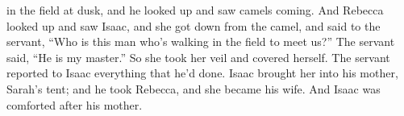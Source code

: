 \begin{inparaenum}
  in the field at dusk, and he looked up and saw camels coming.%
   And Rebecca looked up and saw Isaac, and she got down from%
  the camel,%
   and said to the servant, ``Who is this man who's walking in the field to meet us?'' The servant said, ``He is my master.'' So she took her veil and covered herself.%
   The servant reported to Isaac everything that he'd done.%
   Isaac brought her into his mother, Sarah's tent; and he took Rebecca, and she became his wife. And Isaac was comforted after his mother.%
\end{inparaenum}
